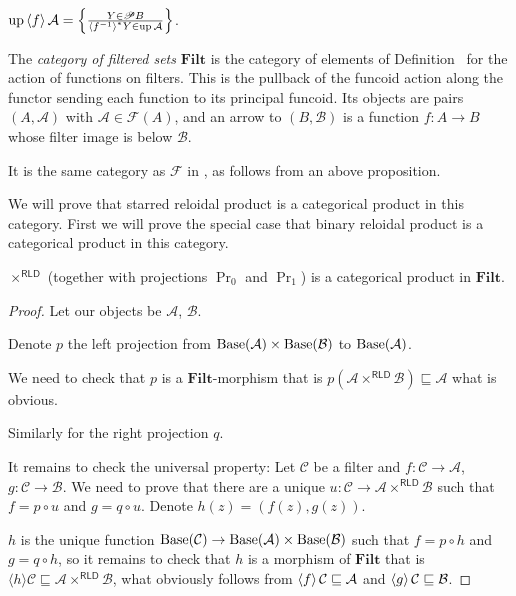 \begin{cor}
$\operatorname{up}\left\langle f\right\rangle\mathcal{A} = \left\{ \frac{Y\in\mathscr{P} B}{\left\langle f^{-1}\right\rangle ^{\ast}Y\in\operatorname{up}\mathcal{A}}\right\}$.
\end{cor}

The \emph{category of filtered sets} $\mathbf{Filt}$ is the
category of elements of Definition~
for the action of functions on filters. This is the pullback of the
funcoid action along the functor sending each function to its
principal funcoid. Its objects are pairs $(A,\mathcal A)$ with
$\mathcal A\in\mathscr F(A)$, and an arrow to $(B,\mathcal B)$ is
a function $f:A\to B$ whose filter image is below $\mathcal B$.

It is the same category as $\mathscr{F}$ in \cite{filt-cat}, as follows from an above proposition.

We will prove that starred reloidal product is a categorical product in this category.
First we will prove the special case that binary reloidal product is a categorical product in this category.

\begin{thm}
  $\times^{\mathsf{RLD}}$ (together with projections $\Pr_0$ and
  $\Pr_1$) is a categorical product in $\mathbf{Filt}$.
\end{thm}

\begin{proof}
  Let our objects be $\mathcal{A}$, $\mathcal{B}$.
  
  Denote $p$ the left projection from $\operatorname{Base} (\mathcal{A}) \times
  \operatorname{Base} (\mathcal{B})$ to $\operatorname{Base} (\mathcal{A})$.
  
  We need to check that $p$ is a $\mathbf{Filt}$-morphism that is $p
  (\mathcal{A} \times^{\mathsf{RLD}} \mathcal{B}) \sqsubseteq
  \mathcal{A}$ what is obvious.
  
  Similarly for the right projection $q$.
  
  It remains to check the universal property: Let $\mathcal{C}$ be a filter
  and $f : \mathcal{C} \rightarrow \mathcal{A}$, $g : \mathcal{C} \rightarrow
  \mathcal{B}$. We need to prove that there are a unique $u : \mathcal{C}
  \rightarrow \mathcal{A} \times^{\mathsf{RLD}} \mathcal{B}$ such that
  $f = p \circ u$ and $g = q \circ u$. Denote $h (z) = (f (z) , g (z))$.
  
  $h$ is the unique function $\operatorname{Base} (\mathcal{C}) \rightarrow
  \operatorname{Base} (\mathcal{A}) \times \operatorname{Base} (\mathcal{B})$ such that $f = p
  \circ h$ and $g = q \circ h$, so it remains to check that $h$ is a morphism
  of $\mathbf{Filt}$ that is $\langle h \rangle \mathcal{C}
  \sqsubseteq \mathcal{A} \times^{\mathsf{RLD}} \mathcal{B}$, what
  obviously follows from $\left\langle f\right\rangle \mathcal{C} \sqsubseteq
  \mathcal{A}$ and $\left\langle g\right\rangle \mathcal{C} \sqsubseteq \mathcal{B}$.
\end{proof}

